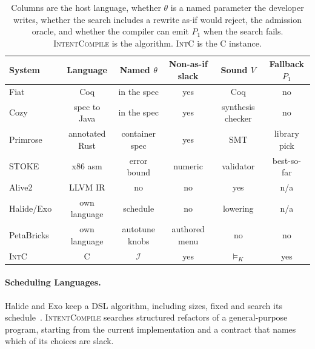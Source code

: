 \begin{table}
\caption{Columns are the host language, whether \(\theta\) is a named
parameter the developer writes, whether the search includes a rewrite
as-if would reject, the admission oracle, and whether the compiler can
emit \(P_1\) when the search fails. \textsc{IntentCompile} is the
algorithm. \textsc{IntC} is the C instance.}
\label{tab:related}
\centering
\scriptsize
\begin{tabular}{lccccc}
\toprule
System & Language & Named \(\theta\) & Non-as-if slack & Sound \(V\) & Fallback \(P_1\) \\
\midrule
Fiat~\cite{delaware2015fiat} & Coq & in the spec & yes & Coq & no \\
Cozy~\cite{loncaric2016cozy} & spec to Java & in the spec & yes & synthesis checker & no \\
Primrose~\cite{Qin2023Primrose} & annotated Rust & container spec & yes & SMT & library pick \\
STOKE~\cite{schkufza2014fp} & x86 asm & error bound & numeric & validator & best-so-far \\
Alive2~\cite{lopes2021alive2} & LLVM IR & no & no & yes & n/a \\
Halide/Exo~\cite{ragan2013halide,ikarashi2022exo} & own language & schedule & no & lowering & n/a \\
PetaBricks~\cite{ansel2009petabricks} & own language & autotune knobs & authored menu & no & no \\
\textsc{IntC} & C & \(\mathcal{I}\) & yes & \(\models_K\) & yes \\
\bottomrule
\end{tabular}
\end{table}

\paragraph{Scheduling Languages.}
Halide and Exo keep a DSL algorithm, including sizes, fixed and search its
schedule~\cite{ragan2013halide,ikarashi2022exo}. \textsc{IntentCompile}
searches structured refactors of a general-purpose program, starting from
the current implementation and a contract that names which of its choices
are slack.

